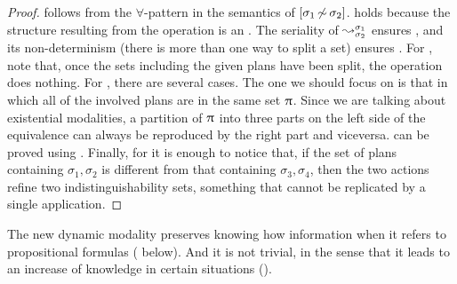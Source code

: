 \begin{proof}
 follows from the $\forall$-pattern in the semantics of $[{\sigma_1{\,\not\sim\,}\sigma_2}]$.
 holds because the structure resulting from the operation is an \ults.
The seriality of $\leadsto^{\sigma_1}_{\sigma_2}$ ensures , and its non-determinism (there is more than one way to split a set) ensures .
For , note that, once the sets including the given plans have been split, the operation does nothing. %
For , there are several cases. The one we should focus on is that in which all of the involved plans are in the same set $\uppi$. Since we are talking about existential modalities, a partition of $\uppi$ into three parts on the left side of the equivalence can always be reproduced by the right part and viceversa. %
 can be proved using . Finally, for  it is enough to notice that, if the set of plans containing $\sigma_1, \sigma_2$ is different from that containing $\sigma_3, \sigma_4$, then the two actions refine two indistinguishability sets, something that cannot be replicated by a single application.
\end{proof}

The new dynamic modality preserves knowing how information when it refers to propositional formulas ( below).  And it is not trivial, in the sense that it leads to an increase of knowledge in certain situations ().

\medskip


